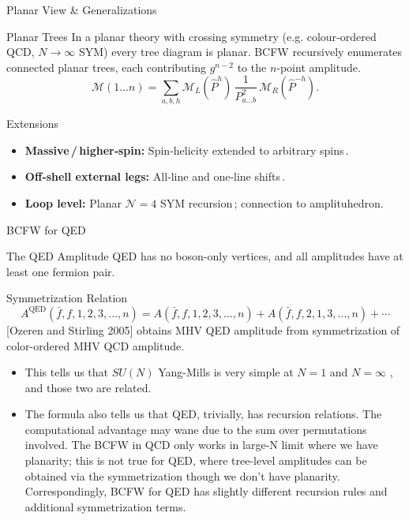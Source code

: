 \documentclass{if-beamer}
\begin{document}
\begin{frame}{Planar View \& Generalizations}
\begin{block}{Planar Trees}
 In a planar theory with crossing symmetry (e.g. colour‑ordered QCD, $N \to \infty$ SYM) every tree diagram is planar. BCFW recursively enumerates connected planar trees, each contributing $g^{n-2}$ to the $n$‑point amplitude.
  \[
  \mathcal{M}(1\dots n)=\sum_{a,b,h}\mathcal{M}_L(\hat P^h)\,\frac{1}{P_{a\dots b}^2}\,\mathcal{M}_R(\hat P^{-h}).
  \]
\end{block}
\begin{block}{Extensions}
\begin{itemize}
  \item \textbf{Massive\,/\,higher‑spin:} Spin‑helicity extended to arbitrary spins\,\autocite{Arkani-Hamed:2017jhn}.
  \item \textbf{Off‑shell external legs:} All‑line and one‑line shifts\,\autocite{vanHameren:2014iua,Cohen:2024xuf}.
  \item \textbf{Loop level:} Planar $\mathcal{N}=4$ SYM recursion\,\autocite{Arkani-Hamed:2010zjl}; connection to amplituhedron.
\end{itemize}
\end{block}
\end{frame}

\begin{frame}{BCFW for QED}
  \begin{block}{The QED Amplitude}
    QED has no boson-only vertices, and all amplitudes have at least one fermion pair. 
  \end{block}
  \begin{block}{Symmetrization Relation}
  $$
  A^{\mathrm{QED}}(\bar{f}, f, 1,2,3, \ldots, n)=A(\bar{f}, f, 1,2,3, \ldots, n)+A(\bar{f}, f, 2,1,3, \ldots, n)+\cdots
  $$  
  [Ozeren and Stirling 2005] obtains MHV QED amplitude from symmetrization of color-ordered MHV QCD amplitude.  
  \end{block}
  \begin{itemize}
    \item This tells us that $SU(N)$ Yang-Mills is very simple at $N = 1$ and $N = \infty$ , and those two are related.
    \item The formula also tells us that QED, trivially, has recursion relations. The computational advantage may wane due to the sum over permutations involved. The BCFW in QCD only works in large-N limit where we have planarity; this is not true for QED, where tree-level amplitudes can be obtained via the symmetrization though we don't have planarity. Correspondingly, BCFW for QED has slightly different recursion rules and additional symmetrization terms.
  \end{itemize}

\end{frame}
\end{document}
